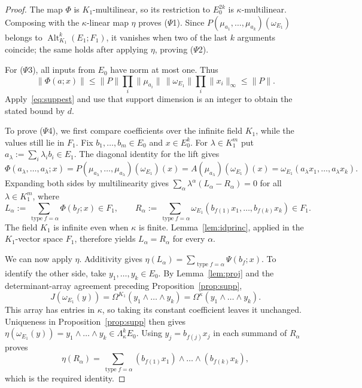 \documentclass[11pt]{amsart}
\theoremstyle{definition}
\theoremstyle{remark}
\numberwithin{equation}{section}
\newcommand{\Alt}{\operatorname{Alt}}
\newcommand{\norm}[1]{\lVert #1\rVert}
\newcommand{\type}{\operatorname{type}}
\theoremstyle{plain}
\theoremstyle{definition}
\theoremstyle{plain}
\begin{document}
\begin{proof}
The map $\Phi$ is $K_1$\nobreakdash-multilinear, so its restriction to $E_0^{2k}$ is $\kappa$\nobreakdash-multilinear.
Composing with the $\kappa$\nobreakdash-linear map $\eta$ proves ($\Psi$1). Since
$P(\mu_{a_1},\dots,\mu_{a_k})(\omega_{E_1})$ belongs to $\Alt^k_{K_1}(E_1;F_1)$, it vanishes when two of the last $k$ arguments
coincide; the same holds after applying $\eta$, proving ($\Psi$2).

For ($\Psi$3), all inputs from $E_0$ have norm at most one. Thus
\[
\norm{\Phi(a;x)}\le\norm P\prod_i\norm{\mu_{a_i}}\,\norm{\omega_{E_1}}\prod_i\norm{x_i}_\infty\le\norm P.
\]
Apply~\eqref{eq:suppest} and use that support dimension is an integer to obtain the stated bound by $d$.

To prove ($\Psi$4), we first compare coefficients over the infinite field $K_1$, while the values still lie in
$F_1$. Fix $b_1,\dots,b_m\in E_0$ and $x\in E_0^k$. For $\lambda\in K_1^m$ put
$a_\lambda:=\sum_i\lambda_ib_i\in E_1$. The diagonal identity for the lift gives
\[
\Phi(a_\lambda,\dots,a_\lambda;x)
=P(\mu_{a_\lambda},\dots,\mu_{a_\lambda})(\omega_{E_1})(x)
=A(\mu_{a_\lambda})(\omega_{E_1})(x)
=\omega_{E_1}(a_\lambda x_1,\dots,a_\lambda x_k).
\]
Expanding both sides by multilinearity gives
$\sum_\alpha\lambda^\alpha(L_\alpha-R_\alpha)=0$ for all $\lambda\in K_1^m$, where
\[
L_\alpha:=\sum_{\type f=\alpha}\Phi(b_f;x)\in F_1,\qquad
R_\alpha:=\sum_{\type f=\alpha}\omega_{E_1}(b_{f(1)}x_1,\dots,b_{f(k)}x_k)\in F_1.
\]
The field $K_1$ is infinite even when $\kappa$ is finite. Lemma~\ref{lem:idprinc}, applied in the
$K_1$\nobreakdash-vector space $F_1$, therefore yields $L_\alpha=R_\alpha$ for every $\alpha$.

We can now apply $\eta$. Additivity gives
$\eta(L_\alpha)=\sum_{\type f=\alpha}\Psi(b_f;x)$. To identify the other side, take $y_1,\dots,y_k\in E_0$.
By Lemma~\ref{lem:proj} and the determinant-array agreement preceding Proposition~\ref{prop:supp},
\[
J(\omega_{E_1}(y))=\Omega^{K_1}(y_1\wedge\dots\wedge y_k)
=\Omega^\kappa(y_1\wedge\dots\wedge y_k).
\]
This array has entries in $\kappa$, so taking its constant coefficient leaves it unchanged. Uniqueness in
Proposition~\ref{prop:supp} then gives
$\eta(\omega_{E_1}(y))=y_1\wedge\dots\wedge y_k\in\Lambda^k_\kappa E_0$.
Using $y_j=b_{f(j)}x_j$ in each summand of $R_\alpha$ proves
\[
\eta(R_\alpha)=\sum_{\type f=\alpha}(b_{f(1)}x_1)\wedge\dots\wedge(b_{f(k)}x_k),
\]
which is the required identity.
\end{proof}
\end{document}
